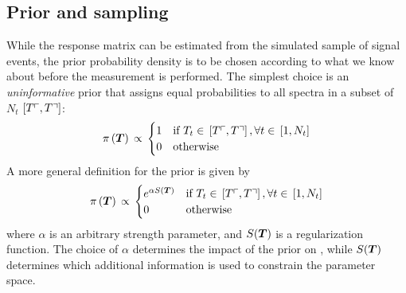 \subsection{Prior and sampling}
\label{sec:fbuprior}
While the response matrix can be estimated from the simulated
sample of signal events, the prior probability density \prior{} is to
be chosen according to what we know about \Truth{} before the
measurement is performed.
The simplest choice is an {\it uninformative}
prior that assigns equal probabilities to all \Truth{} spectra in a
subset of $N_t$ $\left[T\ulcorner{}{}, T\urcorner{}{}\right]$:
\begin{equation}
\pi{}\left(\boldsymbol{T}{}\right){}
\propto{}
\begin{cases}
1 & \text{if }
T_{t}\in{}\left[T\ulcorner{}{}, T\urcorner{}{}\right], \forall{}t\in{}\left[1, N_t\right] \\
0 & \text{otherwise} \\
\end{cases}
\end{equation}
A more general definition for the prior is given by 
\begin{equation}
\pi{}\left(\boldsymbol{T}{}\right){}
\propto{}
\begin{cases}
e^{\alpha{}S(\boldsymbol{T}{})} & \text{if }
T_{t}\in{}\left[T\ulcorner{}{}, T\urcorner{}{}\right], \forall{}t\in{}\left[1, N_t\right] \\
0 & \text{otherwise} \\
\end{cases}
\end{equation}
where $\alpha{}$ is an arbitrary strength parameter, and
$S(\boldsymbol{T}{})$ is a regularization function.
The choice of $\alpha$ determines the impact of the prior on
\conditionalProb{\Truth{}}{\Data{}}, while $S(\boldsymbol{T}{})$ determines
which additional information is used to constrain the parameter
space.

